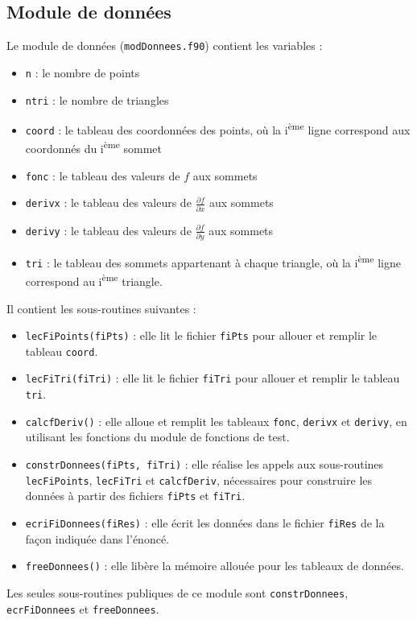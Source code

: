 \documentclass[12 pt]{article}
\newcommand{\up}[1]{\textsuperscript{#1}}
\begin{document}
\subsection{Module de données}
Le module de données (\texttt{modDonnees.f90}) contient les variables :
\begin{itemize}
	\item \texttt{n} : le nombre de points
	\item \texttt{ntri} : le nombre de triangles
	\item \texttt{coord} : le tableau des coordonnées des points, où la i\up{ème} ligne correspond aux coordonnés du i\up{ème} sommet
	\item \texttt{fonc} : le tableau des valeurs de $f$ aux sommets
	\item \texttt{derivx} : le tableau des valeurs de $\frac{\partial{f}}{\partial{x}}$ aux sommets
	\item \texttt{derivy} : le tableau des valeurs de $\frac{\partial{f}}{\partial{y}}$ aux sommets
	\item \texttt{tri} : le tableau des sommets appartenant à chaque triangle, où la i\up{ème} ligne correspond au i\up{ème} triangle.
\end{itemize}
Il contient les sous-routines suivantes : 
\begin{itemize}
	\item \texttt{lecFiPoints(fiPts)} : elle lit le fichier \texttt{fiPts} pour allouer et remplir le tableau \texttt{coord}.
	\item \texttt{lecFiTri(fiTri)} : elle lit le fichier \texttt{fiTri} pour allouer et remplir le tableau \texttt{tri}.
	\item \texttt{calcfDeriv()} : elle alloue et remplit les tableaux \texttt{fonc}, \texttt{derivx} et \texttt{derivy}, en utilisant les fonctions du module de fonctions de test.
	\item  \texttt{constrDonnees(fiPts, fiTri)} : elle réalise les appels aux sous-routines \texttt{lecFiPoints}, \texttt{lecFiTri} et \texttt{calcfDeriv}, nécessaires pour construire les données à partir des fichiers \texttt{fiPts} et \texttt{fiTri}.
	\item \texttt{ecriFiDonnees(fiRes)} : elle écrit les données dans le fichier \texttt{fiRes} de la façon indiquée dans l'énoncé.
	\item \texttt{freeDonnees()} : elle libère la mémoire allouée pour les tableaux de données.
\end{itemize}
Les seules sous-routines publiques de ce module sont \texttt{constrDonnees}, \texttt{ecrFiDonnees} et \texttt{freeDonnees}.
\end{document}
